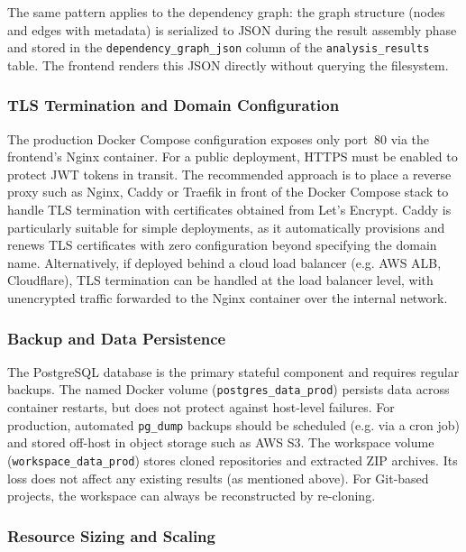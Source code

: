 The same pattern applies to the dependency graph: the graph structure (nodes and edges with metadata) is serialized to JSON during the result assembly phase and stored in the \texttt{dependency\_graph\_json} column of the \texttt{analysis\_results} table. The frontend renders this JSON directly without querying the filesystem.

\subsubsection{TLS Termination and Domain Configuration}
\label{subsubsec:tls}

 \par The production Docker Compose configuration exposes only port~80 via the frontend's Nginx container. For a public deployment, HTTPS must be enabled to protect JWT tokens in transit. The recommended approach is to place a reverse proxy such as Nginx, Caddy or Traefik in front of the Docker Compose stack to handle TLS termination with certificates obtained from Let's Encrypt. Caddy is particularly suitable for simple deployments, as it automatically provisions and renews TLS certificates with zero configuration beyond specifying the domain name. Alternatively, if deployed behind a cloud load balancer (e.g. AWS ALB, Cloudflare), TLS termination can be handled at the load balancer level, with unencrypted traffic forwarded to the Nginx container over the internal network.

\subsubsection{Backup and Data Persistence}
\label{subsubsec:backup}

 \par The PostgreSQL database is the primary stateful component and requires regular backups. The named Docker volume (\texttt{postgres\_data\_prod}) persists data across container restarts, but does not protect against host-level failures. For production, automated \texttt{pg\_dump} backups should be scheduled (e.g. via a cron job) and stored off-host in object storage such as AWS S3. The workspace volume (\texttt{workspace\_data\_prod}) stores cloned repositories and extracted ZIP archives. Its loss does not affect any existing results (as mentioned above). For Git-based projects, the workspace can always be reconstructed by re-cloning.

\subsubsection{Resource Sizing and Scaling}
\label{subsubsec:scaling}

